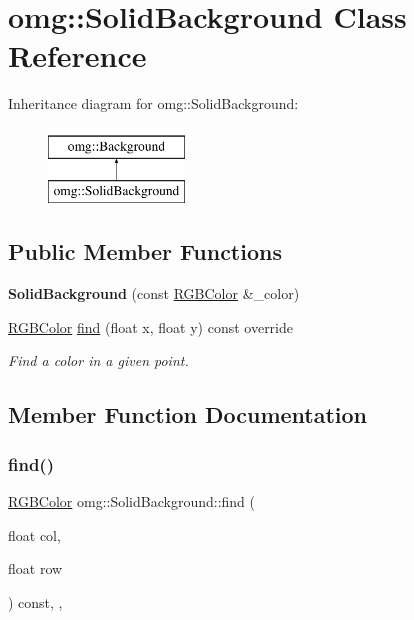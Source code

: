 \hypertarget{classomg_1_1_solid_background}{}\section{omg\+::Solid\+Background Class Reference}
\label{classomg_1_1_solid_background}
Inheritance diagram for omg\+::Solid\+Background\+:\begin{figure}[H]
\begin{center}
\leavevmode
\includegraphics[height=2.000000cm]{classomg_1_1_solid_background}
\end{center}
\end{figure}
\subsection*{Public Member Functions}
\begin{DoxyCompactItemize}
\item 
\mbox{\label{classomg_1_1_solid_background_af0fb464323b7b0b2281395ae40b2c235}} 
{\bfseries Solid\+Background} (const \mbox{\hyperlink{classtao_1_1_col}{R\+G\+B\+Color}} \&\+\_\+color)
\item 
\mbox{\hyperlink{classtao_1_1_col}{R\+G\+B\+Color}} \mbox{\hyperlink{classomg_1_1_solid_background_ac04abd8101b01efbc8dcb6eca309bcb3}{find}} (float x, float y) const override
\begin{DoxyCompactList}\small\item\em Find a color in a given point. \end{DoxyCompactList}\end{DoxyCompactItemize}


\subsection{Member Function Documentation}
\mbox{\label{classomg_1_1_solid_background_ac04abd8101b01efbc8dcb6eca309bcb3}} 
\subsubsection{\texorpdfstring{find()}{find()}}
{\footnotesize\ttfamily \mbox{\hyperlink{classtao_1_1_col}{R\+G\+B\+Color}} omg\+::\+Solid\+Background\+::find (\begin{DoxyParamCaption}\item[{float}]{col,  }\item[{float}]{row }\end{DoxyParamCaption}) const\hspace{0.3cm}{\ttfamily [inline]}, {\ttfamily [override]}, {\ttfamily [virtual]}}



